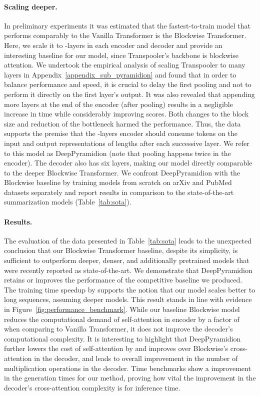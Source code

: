 \documentclass{article}
\begin{document}
\paragraph{Scaling deeper.} In preliminary experiments it was estimated that the fastest-to-train model that performs comparably to the Vanilla Transformer is the Blockwise Transformer. Here, we scale it to -layers in each encoder and decoder and provide an interesting baseline for our model, since Transpooler's backbone is blockwise attention. 
We undertook the empirical analysis of scaling Transpooler to many layers in Appendix~\ref{appendix_sub_pyramidion} and found that in order to balance performance and speed, it is crucial to delay the first pooling and not to perform it directly on the first layer's output. It was also revealed that appending more layers at the end of the encoder (after pooling) results in a negligible increase in time while considerably improving scores. Both changes to the block size and reduction of the bottleneck harmed the performance. Thus, the data supports the premise that the -layers encoder should consume  tokens on the input and output representations of lengths  after each successive layer. We refer to this model as DeepPyramidion (note that pooling happens twice in the encoder). The decoder also has six layers, making our model directly comparable to the deeper Blockwise Transformer. We confront DeepPyramidion with the Blockwise baseline by training models from scratch on arXiv and PubMed datasets separately and report results in comparison to the state-of-the-art summarization models (Table~\ref{tab:sota}).

\paragraph{Results.} 
 The evaluation of the data presented in Table~\ref{tab:sota} leads to the unexpected conclusion that our Blockwise Transformer baseline, despite its simplicity, is sufficient to outperform deeper, denser, and additionally pretrained models that were recently reported as state-of-the-art. We demonstrate that DeepPyramidion retains or improves the performance of the competitive baseline we produced. The training time speedup by  supports the notion that our model scales better to long sequences, assuming deeper models. This result stands in line with evidence in Figure~\ref{fig:performance_benchmark}. While our baseline Blockwise model reduces the computational demand of self-attention in encoder by a factor of  when comparing to Vanilla Transformer, it does not improve the decoder's computational complexity. It is interesting to highlight that DeepPyramidion further lowers the cost of self-attention by  and improves  over Blockwise's cross-attention in the decoder, and leads to overall  improvement in the number of multiplication operations in the decoder.  Time benchmarks show a  improvement in the generation times for our method, proving how vital the improvement in the decoder's cross-attention complexity is for inference time.
\end{document}
